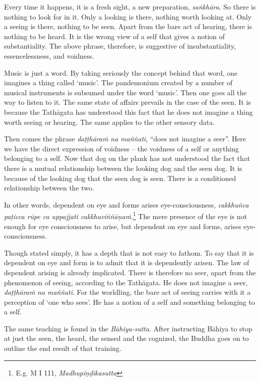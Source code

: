 Every time it happens, it is a fresh sight, a new preparation, \emph{saṅkhāra}. So there is nothing to look for in it. Only a looking is there, nothing worth looking at. Only a seeing is there, nothing to be seen. Apart from the bare act of hearing, there is nothing to be heard. It is the wrong view of a self that gives a notion of substantiality. The above phrase, therefore, is suggestive of insubstantiality, essencelessness, and voidness.

Music is just a word. By taking seriously the concept behind that word, one imagines a thing called `music'. The pandemonium created by a number of musical instruments is subsumed under the word `music'. Then one goes all the way to listen to it. The same state of affairs prevails in the case of the seen. It is because the Tathāgata has understood this fact that he does not imagine a thing worth seeing or hearing. The same applies to the other sensory data.

Then comes the phrase \emph{daṭṭhāraṁ na maññati}, ``does not imagine a seer''. Here we have the direct expression of voidness -- the voidness of a self or anything belonging to a self. Now that dog on the plank has not understood the fact that there is a mutual relationship between the looking dog and the seen dog. It is because of the looking dog that the seen dog is seen. There is a conditioned relationship between the two.

In other words, dependent on eye and forms arises eye-consciousness, \emph{cakkhuñca paṭicca rūpe ca uppajjati cakkhuviññāṇaṁ}.\footnote{E.g. M I 111, \emph{Madhupiṇḍikasutta}} The mere presence of the eye is not enough for eye consciousness to arise, but dependent on eye and forms, arises eye-consciousness.

Though stated simply, it has a depth that is not easy to fathom. To say that it is dependent on eye and form is to admit that it is dependently arisen. The law of dependent arising is already implicated. There is therefore no seer, apart from the phenomenon of seeing, according to the Tathāgata. He does not imagine a seer, \emph{daṭṭhāraṁ na maññati}. For the worldling, the bare act of seeing carries with it a perception of `one who sees'. He has a notion of a self and something belonging to a self.

The same teaching is found in the \emph{Bāhiya-sutta}. After instructing Bāhiya to stop at just the seen, the heard, the sensed and the cognized, the Buddha goes on to outline the end result of that training.

